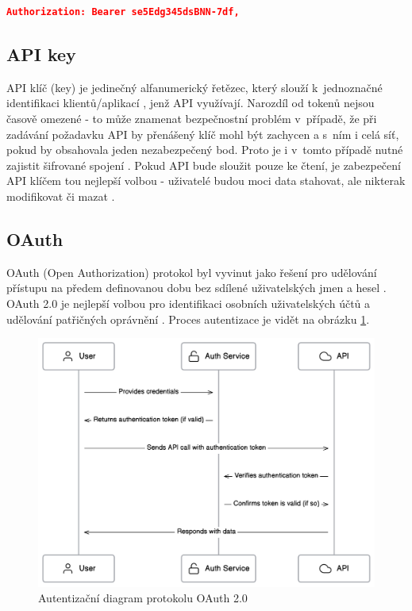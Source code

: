 \documentclass[czech, bc, kiv, he, iso690numb]{fasthesis}
\begin{document}
\begin{lstlisting}[language=json, caption={Autorizační atribut - Bearer schéma}, label=bearerHeader]
	Authorization: Bearer se5Edg345dsBNN-7df,
\end{lstlisting}


\subsection{API key}
API klíč (key) je jedinečný alfanumerický řetězec, který slouží k~jednoznačné identifikaci klientů/aplikací \cite{amazonAPIKey}, jenž API využívají. Narozdíl od tokenů
nejsou časově omezené - to může znamenat bezpečnostní problém v~případě, že při zadávání požadavku API by přenášený klíč mohl být zachycen \cite{mostUsedAuthentication} a s~ním i celá síť, pokud by obsahovala jeden nezabezpečený bod. Proto je i v~tomto případě nutné zajistit šifrované spojení \cite{keepingApiKeysSafe}.
Pokud API bude sloužit pouze ke čtení, je zabezpečení API klíčem tou nejlepší volbou - uživatelé budou moci data stahovat, ale nikterak modifikovat či mazat \cite{mostUsedAuthentication}. 

\subsection{OAuth}
OAuth (Open Authorization) protokol byl vyvinut jako řešení pro udělování přístupu na předem definovanou dobu bez sdílené uživatelských jmen a hesel \cite{understandingOAuth2}. OAuth 2.0
je nejlepší volbou pro identifikaci osobních uživatelských účtů a udělování patřičných oprávnění \cite{mostUsedAuthentication}. Proces autentizace je vidět na obrázku \ref{fig:oauth2Diagram}.

\begin{figure}
	\centering
	\includegraphics[width=1\textwidth]{pictures/oauth2-diagram.png}
	\caption{Autentizační diagram protokolu OAuth 2.0 \cite{oAuthImage}}
	\label{fig:oauth2Diagram}
\end{figure}
\end{document}
